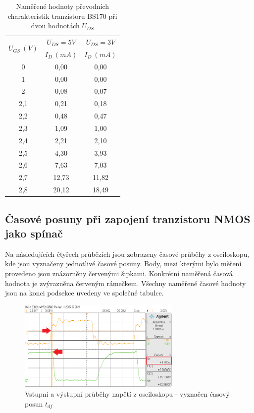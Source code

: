 \documentclass[a4paper, czech]{article}
\begin{document}
\begin{table}[H]
    \centering
    \begin{tabular}{ccc}
        \toprule
        \multirow{2}{*}{$U_{GS}\ (V)$}& $U_{DS}=5V$ & $U_{DS}=3V$ \\
         & $I_D\ (mA)$ & $I_D\ (mA)$ \\
        \midrule
        0   & 0,00  & 0,00  \\
        1   & 0,00  & 0,00  \\
        2   & 0,08  & 0,07  \\
        2,1 & 0,21  & 0,18  \\
        2,2 & 0,48  & 0,47  \\
        2,3 & 1,09  & 1,00  \\
        2,4 & 2,21  & 2,10  \\
        2,5 & 4,30  & 3,93  \\
        2,6 & 7,63  & 7,03  \\
        2,7 & 12,73 & 11,82 \\
        2,8 & 20,12 & 18,49 \\
        \bottomrule
    \end{tabular}
    \caption{Naměřené hodnoty převodních charakteristik tranzistoru BS170 při dvou hodnotách $U_{DS}$}
\end{table}

\pagebreak

\subsection{Časové posuny při zapojení tranzistoru NMOS jako spínač}

Na následujících čtyřech průbězích jsou zobrazeny časové průběhy z osciloskopu, kde jsou vyznačeny jednotlivé časové posuny.
Body, mezi kterými bylo měření provedeno jsou znázorněny červenými šipkami.
Konkrétní naměřená časová hodnota je zvýrazněna červeným rámečkem.
Všechny naměřené časové hodnoty jsou na konci podsekce uvedeny ve společné tabulce. 

\begin{figure}[H]
    \centering
    \includegraphics[width=0.7\textwidth]{t_df.png}
    \caption{Vstupní a výstupní průběhy napětí z osciloskopu - vyznačen časový posun $t_{df}$}
\end{figure}
\end{document}
